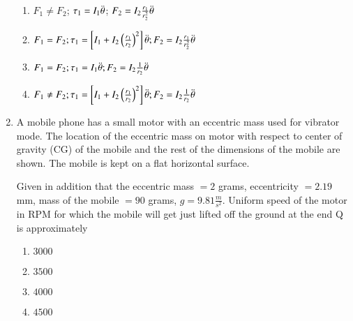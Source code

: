 \documentclass[journal]{IEEEtran}
\begin{document}
\begin{enumerate}
        

    \begin{enumerate}
        \item $F_1\neq F_2$;
        $\tau_1=I_1\Ddot{\theta} $;
        $ F_2=I_2\frac{r_1}{r_2^2}\Ddot{\theta}$
        \item $F_1= F_2;\tau_1=\left[I_1+I_2\left(\frac{r_1}{r_2}\right)^2\right]\Ddot{\theta}; F_2=I_2\frac{r_1}{r_2^2}\Ddot{\theta}$
        \item $F_1= F_2;\tau_1=I_1\Ddot{\theta}; F_2=I_2\frac{1}{r_2}\Ddot{\theta}$
        \item $F_1\neq F_2;\tau_1=\left[I_1+I_2\left(\frac{r_1}{r_2}\right)^2\right]\Ddot{\theta}; F_2=I_2\frac{1}{r_2}\Ddot{\theta}$
    \end{enumerate}


    
    \item A mobile phone has a small motor with an eccentric mass used for vibrator mode. The location of the eccentric mass on motor with respect to center of gravity (CG) of the mobile and the rest of the dimensions of the mobile are shown. The mobile is kept on a flat horizontal surface. 

    

    Given in addition that the eccentric mass $=2$ grams, eccentricity $=2.19$ mm, mass of the mobile $=90$ grams, $g=9.81\frac{m}{s^2}$. Uniform speed of the motor in RPM for which the mobile will get just lifted off the ground at the end Q is approximately
    
    \begin{multicols}{4}
    \begin{enumerate}
        \item $3000$
        \item $3500$
        \item $4000$
        \item $4500$
    \end{enumerate}
    \end{multicols}


\end{enumerate}
\end{document}
